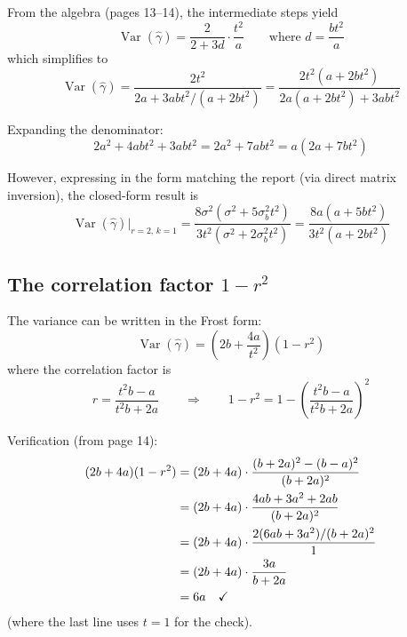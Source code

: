 \documentclass[11pt]{article}
\DeclareMathOperator{\Var}{Var}
\begin{document}
From the algebra (pages 13--14), the intermediate steps
yield
\begin{equation}
  \Var(\hat\gamma) = \frac{2}{2+3d}\cdot\frac{t^2}{a}
  \qquad\text{where } d = \frac{bt^2}{a}
\end{equation}
which simplifies to
\begin{equation}
  \Var(\hat\gamma)
  = \frac{2t^2}{2a + 3abt^2/(a + 2bt^2)}
  = \frac{2t^2(a + 2bt^2)}{2a(a + 2bt^2) + 3abt^2}
\end{equation}

Expanding the denominator:
\begin{equation}
  2a^2 + 4abt^2 + 3abt^2
  = 2a^2 + 7abt^2
  = a(2a + 7bt^2)
\end{equation}

However, expressing in the form matching the report
(via direct matrix inversion), the closed-form result is
\begin{equation}
  \boxed{
    \Var(\hat\gamma)\big|_{r=2,\,k=1}
    = \frac{8\sigma^2(\sigma^2 + 5\sigma_b^2 t^2)}
           {3t^2(\sigma^2 + 2\sigma_b^2 t^2)}
    = \frac{8a(a + 5bt^2)}{3t^2(a + 2bt^2)}
  }
  \label{eq:var_r2k1}
\end{equation}


\subsection{The correlation factor $1 - r^2$}

The variance can be written in the Frost form:
\begin{equation}
  \Var(\hat\gamma) = \left(2b + \frac{4a}{t^2}\right)(1 - r^2)
\end{equation}
where the correlation factor is
\begin{equation}
  \boxed{
    r = \frac{t^2 b - a}{t^2 b + 2a}
  }
  \qquad\Longrightarrow\qquad
  1 - r^2 = 1 - \left(\frac{t^2 b - a}{t^2 b + 2a}\right)^2
\end{equation}

Verification (from page 14):
\begin{align}
  (2b + 4a)(1 - r^2)
  &= (2b + 4a)\cdot\frac{(b+2a)^2 - (b-a)^2}{(b+2a)^2}
    \notag \\
  &= (2b + 4a)\cdot\frac{4ab + 3a^2 + 2ab}{(b+2a)^2}
    \notag \\
  &= (2b + 4a)\cdot\frac{2(6ab + 3a^2)/(b+2a)^2}{1}
    \notag \\
  &= (2b + 4a)\cdot\frac{3a}{b + 2a}
    \notag \\
  &= 6a \quad \checkmark
\end{align}
(where the last line uses $t = 1$ for the check).
\end{document}
